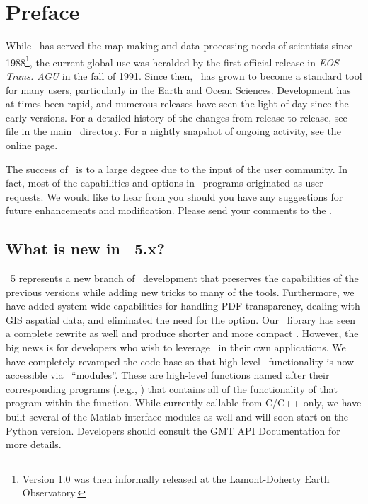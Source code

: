 %
%
\chapter{Preface} 
\label{ch:1}

While \GMT\ has served the map-making and data processing needs of scientists since 1988\footnote{Version
1.0 was then informally released at the Lamont-Doherty Earth Observatory.}, the current global use was
heralded by the first official release in \emph{EOS Trans. AGU} in the fall of 1991.  Since then,
\GMT\ has grown to become a standard tool for many users, particularly in the Earth and Ocean Sciences.
Development has at times been rapid, and numerous releases have seen the light of day since the early
versions.  For a detailed history of the changes from release to release, see file 
in the main \GMT\ directory.  For a nightly snapshot of ongoing activity, see the online
 page.

The success of \GMT\ is to a large degree due to the input of the user community. In fact, most of the
capabilities and options in \GMT\ programs originated as user requests.
We would like to hear from you should you have any suggestions for future enhancements and modification.
Please send your comments to the
.

\section{What is new in \gmt\ 5.x?}

\GMT\ 5 represents a new branch of \GMT\ development that preserves the capabilities of the previous
versions while adding new tricks to many of the tools.  Furthermore, we have added system-wide
capabilities for handling PDF transparency, dealing with GIS aspatial data, and eliminated the need
for the  option.  Our \PS\ library  has seen a complete rewrite as well and produce
shorter and more compact \PS.
However, the big news is for developers who wish to leverage \GMT\ in their
own applications.  We have completely revamped the code base so that high-level \GMT\ functionality
is now accessible via \GMT\ ``modules''.  These are high-level functions named after their corresponding
programs (.e.g., ) that contains all of the functionality of that program within
the function.  While currently callable from C/C++ only, we have built several of the Matlab interface
modules as well and will soon start on the Python version.  Developers should consult the GMT API Documentation for more details.

